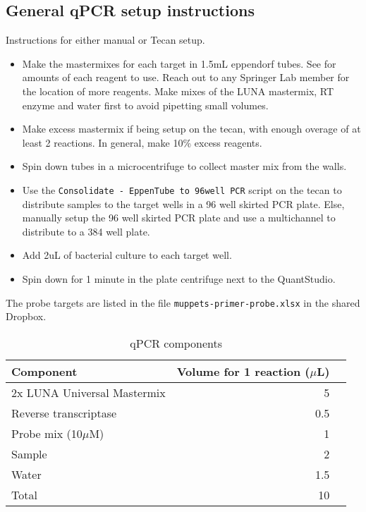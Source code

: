 \documentclass{article}
\begin{document}
\subsection{General qPCR setup instructions}
\label{sec:qpcr-setup}
Instructions for either manual or Tecan setup.
\begin{itemize}
\item Make the mastermixes for each target in 1.5mL eppendorf tubes. See  for amounts of each reagent to use. Reach out to any Springer Lab member for the location of more reagents. Make mixes of the LUNA mastermix, RT enzyme and water first to avoid pipetting small volumes.
\item Make excess mastermix if being setup on the tecan, with enough overage of at least 2 reactions. In general, make 10\% excess reagents.
\item Spin down tubes in a microcentrifuge to collect master mix from the walls.
\item Use the \texttt{Consolidate - EppenTube to 96well PCR} script on the tecan to distribute samples to the target wells in a 96 well skirted PCR plate. Else, manually setup the 96 well skirted PCR plate and use a multichannel to distribute to a 384 well plate.
\item Add 2uL of bacterial culture to each target well.
\item Spin down for 1 minute in the plate centrifuge next to the QuantStudio.
\end{itemize}

The probe targets are listed in the file \texttt{muppets-primer-probe.xlsx} in the shared Dropbox.

\begin{table}[h]
  \centering

  \begin{tabular}{lrr}
    Component &Volume for 1 reaction ($\mu$L)\\
    \hline
    2x LUNA Universal Mastermix & 5\\
    Reverse transcriptase & 0.5 \\
    Probe mix (10$\mu$M) & 1 \\
    Sample & 2\\
    Water & 1.5\\
    \hline
    Total & 10
  \end{tabular}
  \caption{qPCR components}
  \label{tab:qpcr-calculations}
\end{table}
\end{document}
